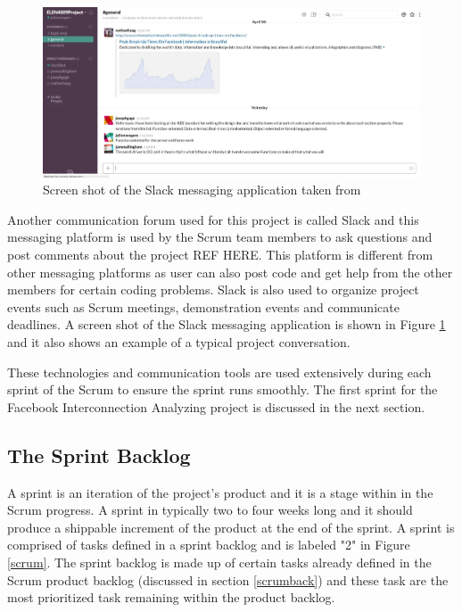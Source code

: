 \documentclass[12pt,onecolumn]{article}
\begin{document}
	
	\begin{figure}[h!]
		\centering
		\includegraphics[width=\textwidth]{slick}
		\caption{Screen shot of the Slack messaging application taken from \cite{slack}}
		\label{slack}
	\end{figure}
	
	
	Another communication forum used for this project is called Slack and this messaging platform is used by the Scrum team members to ask questions and post comments about the project REF HERE. This platform is different from other messaging platforms as user can also post code and get help from the other members for certain coding problems. Slack is also used to organize project events such as Scrum meetings, demonstration events and communicate deadlines. A screen shot of the Slack messaging application is shown in Figure \ref{slack} and it also shows an example of a typical project conversation.
	
	
	
	These technologies and communication tools are used extensively during each sprint of the Scrum to ensure the sprint runs smoothly. The first sprint for the Facebook Interconnection Analyzing project is discussed in the next section. 
	
	
	\subsection{The Sprint Backlog } \label{sprintback}
	A sprint is an iteration of the project's product and it is a stage within in the Scrum progress. A sprint in typically two to four weeks long and it should produce a shippable increment of the product at the end of the sprint. A sprint is comprised of tasks defined in a sprint backlog and is labeled "2" in Figure \ref{scrum}. The sprint backlog is made up of certain tasks already defined in the Scrum product backlog (discussed in section \ref{scrumback}) and these task are the most prioritized task remaining within the product backlog. 
	
\end{document}
